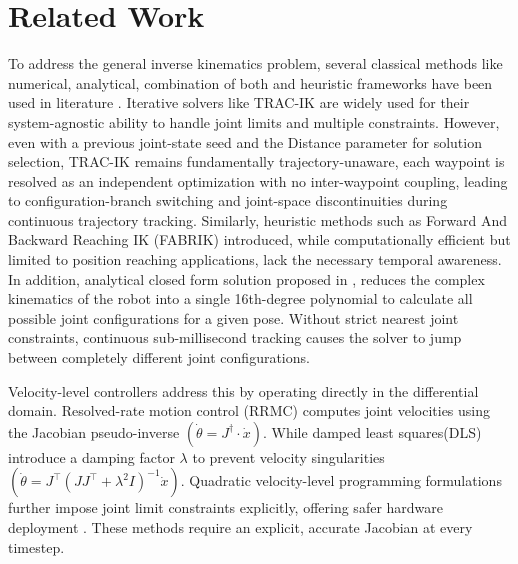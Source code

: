 \documentclass[preprint,12pt]{elsarticle}
\begin{document}
\section{Related Work}
\label{related work}
To address the general inverse kinematics problem, several classical methods like numerical, analytical, combination of both and heuristic frameworks have been used in literature \cite{ABDORSIERRA2022100597}. Iterative solvers like TRAC-IK \cite{tracik} are widely used for their system-agnostic ability to handle joint limits and multiple constraints. However, even with a previous joint-state seed and the Distance parameter for solution selection, TRAC-IK remains fundamentally trajectory-unaware, each waypoint is resolved as an independent optimization with no inter-waypoint coupling, leading to configuration-branch switching and joint-space discontinuities during continuous trajectory tracking. Similarly, heuristic methods such as Forward And Backward Reaching IK (FABRIK) \cite{fabrik} introduced, while computationally efficient but limited to position reaching applications, lack the necessary temporal awareness. In addition, analytical closed form solution proposed in \cite{zohour2021kinova}, reduces the complex kinematics of the robot into a single 16th-degree polynomial to calculate all possible joint configurations for a given pose. Without strict nearest joint constraints, continuous sub-millisecond tracking causes the solver to jump between completely different joint configurations.

Velocity-level controllers address this by operating directly in the differential domain. Resolved-rate motion control (RRMC) \cite{whiteney1969resolved} computes joint velocities using the Jacobian pseudo-inverse $(\dot{\theta}=J^{\dagger}\cdot\dot{x})$. While damped least squares(DLS)\cite{DLS, chiaverini1994review} introduce a damping factor $\lambda$ to prevent velocity singularities $(\dot{\theta} = J^\top(JJ^\top + \lambda^2 I)^{-1}\dot{x})$. Quadratic velocity-level  programming formulations \cite{velocityqp} further impose joint limit constraints explicitly, offering safer hardware deployment \cite{velocityqp_2}. These methods require an explicit, accurate Jacobian at every timestep.
\end{document}
